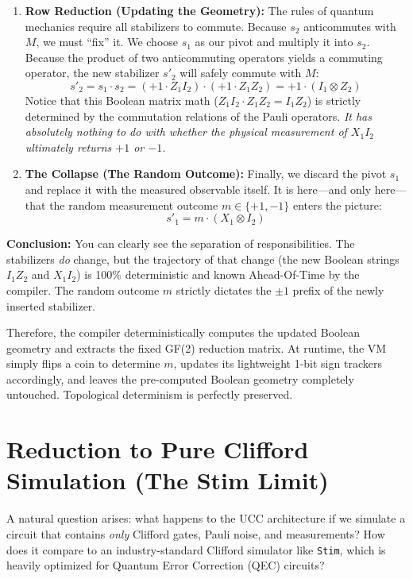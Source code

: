 \documentclass[11pt]{article}
\begin{document}
\begin{enumerate}
    \item \textbf{Row Reduction (Updating the Geometry):} The rules of quantum mechanics require all stabilizers to commute. Because $s_2$ anticommutes with $M$, we must ``fix'' it. We choose $s_1$ as our pivot and multiply it into $s_2$. Because the product of two anticommuting operators yields a commuting operator, the new stabilizer $s'_2$ will safely commute with $M$:
    $$s'_2 = s_1 \cdot s_2 = (+1 \cdot Z_1 I_2) \cdot (+1 \cdot Z_1 Z_2) = +1 \cdot (I_1 \otimes Z_2)$$
    Notice that this Boolean matrix math ($Z_1 I_2 \cdot Z_1 Z_2 = I_1 Z_2$) is strictly determined by the commutation relations of the Pauli operators. \textit{It has absolutely nothing to do with whether the physical measurement of $X_1 I_2$ ultimately returns $+1$ or $-1$.}

    \item \textbf{The Collapse (The Random Outcome):} Finally, we discard the pivot $s_1$ and replace it with the measured observable itself. It is here—and only here—that the random measurement outcome $m \in \{+1, -1\}$ enters the picture:
    $$s'_1 = m \cdot (X_1 \otimes I_2)$$
\end{enumerate}

\textbf{Conclusion:} You can clearly see the separation of responsibilities. The stabilizers \textit{do} change, but the trajectory of that change (the new Boolean strings $I_1 Z_2$ and $X_1 I_2$) is 100\% deterministic and known Ahead-Of-Time by the compiler. The random outcome $m$ strictly dictates the $\pm 1$ prefix of the newly inserted stabilizer.

Therefore, the compiler deterministically computes the updated Boolean geometry and extracts the fixed GF(2) reduction matrix. At runtime, the VM simply flips a coin to determine $m$, updates its lightweight 1-bit sign trackers accordingly, and leaves the pre-computed Boolean geometry completely untouched. Topological determinism is perfectly preserved.

\newpage
\section{Reduction to Pure Clifford Simulation (The Stim Limit)}
\label{app:stim}

A natural question arises: what happens to the UCC architecture if we simulate a circuit that contains \textit{only} Clifford gates, Pauli noise, and measurements? How does it compare to an industry-standard Clifford simulator like \texttt{Stim}, which is heavily optimized for Quantum Error Correction (QEC) circuits?
\end{document}
